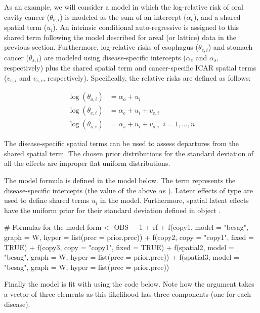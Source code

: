 As an example, we will consider a model in which the log-relative risk of oral cavity cancer ($\theta_{o,i}$) is modeled as the sum of an intercept ($\alpha_{o}$), and a shared spatial term ($u_i$). An intrinsic conditional auto-regressive \citep[ICAR,][]{banerjee2014hierarchical} is assigned to this shared term following the model described for areal (or lattice) data in the previous section. Furthermore, log-relative risks of esophagus ($\theta_{e,i}$) and stomach cancer ($\theta_{s,i}$) are modeled using disease-specific intercepts ($\alpha_e$ and $\alpha_s$, respectively) plus the shared spatial term and cancer-specific ICAR spatial terms ($v_{e,i}$ and $v_{s,i}$, respectively). Specifically, the relative risks are defined as follows: 

\begin{align*}
\log(\theta_{o,i}) &= \alpha_{o} + u_i  \\
\log(\theta_{e,i})  &= \alpha_e + u_i + v_{e,i}\\
\log(\theta_{s,i})  &= \alpha_s + u_i + v_{s,i}  \, \,\, i=1,\ldots, n\nonumber
\end{align*}

The disease-specific spatial terms can be used to assess departures from the shared spatial term. The chosen prior distributions for the standard deviation of all the effects are improper flat uniform distributions.

The model formula is defined in the model below. The  term represents the disease-specific intercepts (the value of the above $\alpha$s ). Latent effects of type  \citep[see, for example, Section 6.5.1 in][]{gomez2020bayesian} are used to define shared terms  $u_i$ in the model. Furthermore, spatial latent effects have the uniform prior for their standard deviation defined in object .

\begin{example*}
# Formulas for the model
form <- OBS ~ -1 + rf +
  f(copy1, model = "besag", graph = W, hyper = list(prec = prior.prec)) +
  f(copy2, copy = "copy1", fixed = TRUE) +
  f(copy3, copy = "copy1", fixed = TRUE) +
  f(spatial2, model = "besag", graph = W, hyper = list(prec = prior.prec)) +
  f(spatial3, model = "besag", graph = W, hyper = list(prec = prior.prec))
\end{example*}

Finally the model is fit with  using the code below. Note how the  argument takes a vector of three elements as this likelihood has three components (one for each disease).

